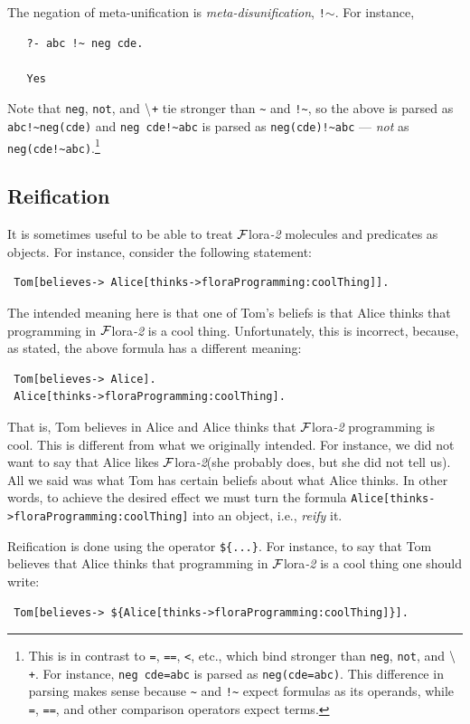 \documentclass[11pt]{article}
\newcommand{\FLORA}{{\mbox{\sc ${\cal F}${lora}\rm\emph{-2}}}\xspace}
\newcommand{\NAF}{\mbox{\tt \ensuremath{\tt\backslash}+}\xspace}
\begin{document}
The negation of meta-unification is \emph{meta-disunification}, {\tt !$\sim$}. 
For instance,
\begin{verbatim}
   ?- abc !~ neg cde.

   Yes
\end{verbatim}
Note that {\tt neg}, {\tt not}, and \NAF tie stronger than \verb|~| and
\verb|!~|, so the above is parsed as \verb|abc!~neg(cde)| and
\verb|neg cde!~abc| is parsed as  \verb|neg(cde)!~abc| --- \emph{not} as
\verb|neg(cde!~abc)|.\footnote{
  This is in contrast to {\tt =}, {\tt ==}, {\tt <}, etc., which bind
  stronger than {\tt neg}, {\tt not}, and \NAF. For instance, {\tt neg
    cde=abc} is parsed as {\tt neg(cde=abc)}. This difference in parsing
  makes sense because {\tt \~{}}  and
  {\tt !\~{}}  expect formulas as its
  operands, while {\tt =}, {\tt ==}, and other comparison operators expect
  terms.
  }
 

\subsection{Reification}
\label{sec-reification}

It is sometimes useful to be able to treat \FLORA molecules and predicates
as objects. For instance, consider the following statement:
\begin{verbatim}
 Tom[believes-> Alice[thinks->floraProgramming:coolThing]].
\end{verbatim}
The intended meaning here is that one of Tom's beliefs is that Alice
thinks that programming in \FLORA is a cool thing. Unfortunately, this is
incorrect, because, as stated, the above formula has a different meaning:
\begin{verbatim}
 Tom[believes-> Alice].
 Alice[thinks->floraProgramming:coolThing].  
\end{verbatim}
That is, Tom believes in Alice and Alice thinks that \FLORA programming is
cool. This is different from what we originally intended. For instance, we
did not want to say that Alice likes \FLORA (she probably does, but she did
not tell us). All we said was what Tom has certain beliefs about what Alice
thinks. In other words, to achieve the desired effect we must turn the
formula {\tt Alice[thinks->floraProgramming:coolThing]} into an object,
i.e., \emph{reify} it.

Reification is done using the operator {\tt \$\{...\}}. For instance, to
say that Tom believes that Alice thinks that programming in \FLORA is a
cool thing one should write:
\begin{verbatim}
 Tom[believes-> ${Alice[thinks->floraProgramming:coolThing]}].
\end{verbatim}
\end{document}

